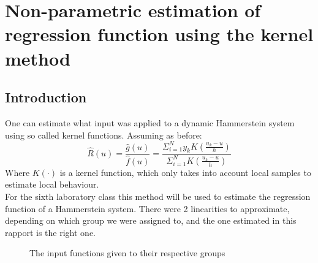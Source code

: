 \chapter{Non-parametric estimation of regression function using the kernel method}
\section{Introduction}
One can estimate what input was applied to a dynamic Hammerstein system using so called kernel functions.
Assuming as before:
\begin{equation}
    \hat{R}(u) = \frac{\hat{g}(u)}{\hat{f}(u)} =   \frac{\Sigma_{i=1}^{N} y_k K( \frac{u_k-u}{h}) }{   \Sigma_{i=1}^{N} K( \frac{u_k-u}{h}) }
\end{equation}
Where $K(\cdot)$ is a kernel function, which only takes into account local samples to estimate local behaviour.\\
For the sixth laboratory class this method will be used to estimate the regression function of a Hammerstein system.
There were 2 linearities to approximate, depending on which group we were assigned to, and the one estimated in this rapport is the right one.

\begin{figure}[h!]
\begin{center}
\end{center}
\label{app_fig}
\caption{The input functions given to their respective groups}
\end{figure}
